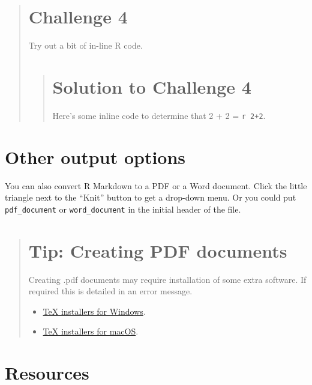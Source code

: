 \documentclass[]{book}
\providecommand{\tightlist}{%
  \setlength{\itemsep}{0pt}\setlength{\parskip}{0pt}}
\begin{document}
\begin{quote}
\section{Challenge 4}\label{challenge-4}

Try out a bit of in-line R code.

\begin{quote}
\section{Solution to Challenge 4}\label{solution-to-challenge-4}

Here's some inline code to determine that 2 + 2 =
\texttt{\textasciigrave{}r\ 2+2\textasciigrave{}}.
\end{quote}
\end{quote}

\section{Other output options}\label{other-output-options}

You can also convert R Markdown to a PDF or a Word document. Click the
little triangle next to the ``Knit'' button to get a drop-down menu. Or
you could put \texttt{pdf\_document} or \texttt{word\_document} in the
initial header of the file.

\begin{quote}
\section{Tip: Creating PDF documents}\label{tip-creating-pdf-documents}

Creating .pdf documents may require installation of some extra software.
If required this is detailed in an error message.

\begin{itemize}
\tightlist
\item
  \href{https://miktex.org/2.9/setup}{TeX installers for Windows}.
\item
  \href{https://tug.org/mactex}{TeX installers for macOS}.
\end{itemize}
\end{quote}

\section{Resources}\label{resources}
\end{document}
